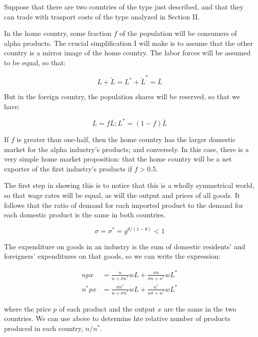 Suppose that there are two countries of the type just described, and that they can trade with trasport costs of the type analyzed in Section II.

In the home country, some fraction $f$ of the population will be consumers of alpha products. The crucial simplification I will make is to assume that the other country is a mirror image of the home country. The labor forces will be assumed to be equal, so that:

\begin{equation}
    L + \tilde{L} = L^* + \tilde{L}^* = \overline{L}
\end{equation}

But in the foreign country, the population shares will be reserved, so that we have:

\begin{equation}
    L = f\overline{L}; L^* = (1 - f)\overline{L}
\end{equation}

If $f$ is greater than one-half, then the home country has the larger domestic market for the alpha industry's products; and conversely. In this case, there is a very simple home market proposition: that the home country will be a net exporter of the first industry's products if $f > 0.5$.

The first step in showing this is to notice that this is a wholly symmetrical world, so that wage rates will be equal, as will the output and prices of all goods. It follows that the ratio of demand for each imported product to the demand for each domestic product is the same in both countries.

\begin{equation}
    \sigma = \sigma^*=  g^{\theta / (1 - \theta)} < 1
\end{equation}

The expenditure on goods in an industry is the sum of domestic residents' and foreigners' expenditures on that goods, so we can write the expression:

\begin{equation}
    \begin{aligned}
        npx & = \frac{n}{n + \sigma n^*}wL + \frac{\sigma n}{\sigma n + n^*}wL^* \\
        n^*px & = \frac{\sigma n^*}{n + \sigma n^*}wL + \frac{n^*}{n \sigma + n^*}wL^*
    \end{aligned}
\end{equation}

where the price $p$ of each product and the output $x$ are the same in the two countries. We can use above to determine hte relative number of products produced in each country, $n / n^*$.

